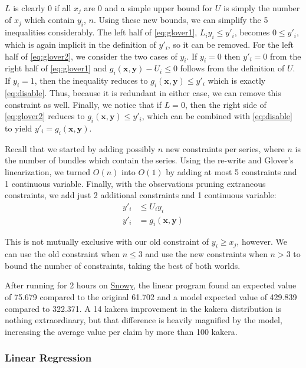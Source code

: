 \documentclass[11pt, oneside]{article}
\theoremstyle{plain}
\theoremstyle{definition}
\begin{document}
\( L \) is clearly 0 if all \( x_j \) are 0 and a simple upper bound for \( U
\) is simply the number of \( x_j \) which contain \( y_i \), \( n \). Using
these new bounds, we can simplify the 5 inequalities considerably. The left
half of \eqref{eq:glover1}, \( L_i y_i \leq y'_i \), becomes \( 0 \leq y'_i
\), which is again implicit in the definition of \( y'_i \), so it can be
removed. For the left half of \eqref{eq:glover2}, we consider the two cases
of \( y_i \). If \( y_i = 0 \) then \( y'_i = 0 \) from the right half of
\eqref{eq:glover1} and \( g_i(\bm{x}, \bm{y}) - U_i \leq 0 \) follows from
the definition of \( U \). If \( y_i = 1 \), then the inequality reduces to
\( g_i(\bm{x}, \bm{y}) \leq y'_i \) which is exactly \eqref{eq:disable}.
Thus, because it is redundant in either case, we can remove this constraint
as well. Finally, we notice that if \( L = 0 \), then the right side of
\eqref{eq:glover2} reduces to \( g_i(\bm{x}, \bm{y}) \leq y'_i \), which can
be combined with \eqref{eq:disable} to yield \( y'_i = g_i(\bm{x}, \bm{y}) \).

Recall that we started by adding possibly \( n \) new constraints per
series, where \( n \) is the number of bundles which contain the series.
Using the re-write and Glover's linearization, we turned \( O(n) \) into
\( O(1) \) by adding at most 5 constraints and 1 continuous variable.
Finally, with the observations pruning extraneous constraints, we add
just 2 additional constraints and 1 continuous variable:
\begin{align*}
  y'_i &\leq U_i y_i \\
  y'_i &= g_i(\bm{x}, \bm{y})
\end{align*}

This is not mutually exclusive with our old constraint of \( y_i \geq x_j
\), however. We can use the old constraint when \( n \leq 3 \) and use the
new constraints when \( n > 3 \) to bound the number of constraints, taking
the best of both worlds.

After running for 2 hours on
\href{https://documentation.tjhsst.edu/machines/other/snowy}{Snowy}, the
linear program found an expected value of 75.679 compared to the original
61.702 and a model expected value of 429.839 compared to 322.371. A 14
kakera improvement in the kakera distribution is nothing extraordinary,
but that difference is heavily magnified by the model, increasing
the average value per claim by more than 100 kakera.

\subsubsection{Linear Regression}
\end{document}
